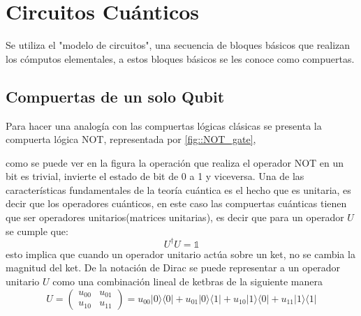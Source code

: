 \documentclass[a4paper]{article}
\begin{document}
\section{Circuitos Cuánticos}
Se utiliza el "modelo de circuitos", una secuencia de bloques básicos que realizan los cómputos elementales, a estos bloques básicos se les conoce como compuertas.
\subsection{Compuertas de un solo Qubit}
Para hacer una analogía con las compuertas lógicas clásicas se presenta la compuerta lógica NOT, representada por \ref{fig::NOT_gate}, 

como se puede ver en la figura la operación que realiza el operador NOT en un bit es trivial, invierte el estado de bit de 0 a 1 y viceversa.
Una de las características fundamentales de la teoría cuántica es el hecho que es unitaria, es decir que los operadores cuánticos, en este caso las compuertas cuánticas tienen que ser operadores unitarios(matrices unitarias), es decir que para un operador $U$ se cumple que:
\begin{equation}
U^\dagger U=\mathbb{1}
\end{equation}
esto implica que cuando un operador unitario actúa sobre un ket, no se cambia la magnitud del ket. De la notación de Dirac se puede representar a un operador unitario $U$ como  una combinación lineal de ketbras de la siguiente manera
\begin{equation}
U=
	\begin{pmatrix}
		u_{00} &u_{01} \\
		u_{10} &u_{11}
	\end{pmatrix}=u_{00}|0\rangle\langle 0|+u_{01}|0\rangle\langle 1|+u_{10}|1\rangle\langle 0|+
	u_{11}|1\rangle\langle 1|
\end{equation}
\end{document}
